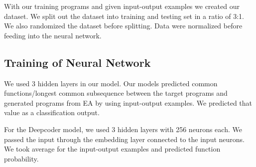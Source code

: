 With our training programs and given input-output examples we created our dataset. We split out the dataset into training and testing set in a ratio of 3:1. We also randomized the dataset before splitting. Data were normalized before feeding into the neural network. 


\subsection{Training of Neural Network}

We used 3 hidden layers in our model. Our models predicted common functions/longest common subsequence between the target programs and generated programs from EA by using input-output examples. We predicted that value as a classification output.

For the Deepcoder model, we used 3 hidden layers with 256 neurons each. We passed the input through the embedding layer connected to the input neurons. We took average for the input-output examples and predicted function probability.